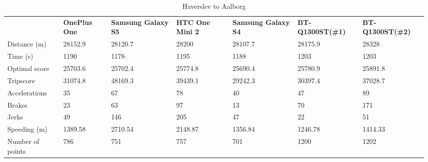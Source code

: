 \begin{table}[]
\centering
\caption{Haverslev to Aalborg}
\label{my-label}
\begin{tabular}{|l|llllll|}
\hline
\rowcolor{tablegreen}

                 & \textbf{OnePlus One} & \textbf{Samsung Galaxy S5} & \textbf{HTC One Mini 2} & \textbf{Samsung Galaxy S4} & \textbf{BT-Q1300ST(\#1)} & \textbf{BT-Q1300ST(\#2)} \\
Distance (m)     & 28152.9     & 28120.7           & 28200          & 28107.7           & 28175.9         & 28328           \\
Time (s)         & 1190        & 1178              & 1195           & 1188              & 1203            & 1203            \\
Optimal score    & 25703.6     & 25702.4           & 25774.8        & 25690.4           & 25780.9         & 25891.8         \\
Tripscore        & 31074.8     & 48169.3           & 39439.1        & 29242.3           & 30397.4         & 37028.7         \\
Accelerations    & 35          & 67                & 78             & 40                & 47              & 89              \\
Brakes           & 23          & 63                & 97             & 13                & 70              & 171             \\
Jerks            & 49          & 146               & 205            & 47                & 22              & 51              \\
Speeding (m)     & 1389.58     & 2710.54           & 2148.87        & 1356.84           & 1246.78         & 1414.33         \\
Number of points & 786         & 751               & 757            & 701               & 1200            & 1202            \\\hline
\end{tabular}
\end{table}

